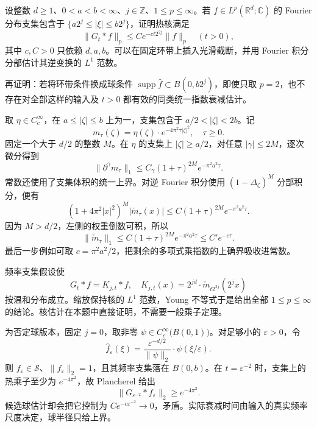 \begin{exercise}\label{b2:ex:19-new-5}
设整数 \(d\geq1\)、\(0<a<b<\infty\)、\(j\in\mathbb Z\)、\(1\leq p\leq\infty\)。若 \(f\in L^p(\mathbb R^d;\mathbb C)\) 的 Fourier 分布支集包含于
\(\{a2^j\leq|\xi|\leq b2^j\}\)，证明热核满足
\[
 \|G_t*f\|_p\leq C e^{-c t2^{2j}}\|f\|_p
 \quad(t>0),
\]
其中 \(c,C>0\) 只依赖 \(d,a,b\)。可以在固定环带上插入光滑截断，并用 Fourier 积分分部估计其逆变换的 \(L^1\) 范数。

\ProseParagraphBreak

再证明：若将环带条件换成球条件 \(\operatorname{supp}\widehat f\subset B(0,b2^j)\)，即使只取 \(p=2\)，也不存在对全部这样的输入及 \(t>0\) 都有效的同类统一指数衰减估计。
\end{exercise}
\begin{solution}
取 \(\eta\in C_c^\infty\)，在 \(a\leq|\zeta|\leq b\) 上为一，支集包含于 \(a/2<|\zeta|<2b\)。记
\[
 m_\tau(\zeta)=\eta(\zeta)\cdot e^{-4\pi^2\tau|\zeta|^2},
 \quad \tau\geq0.
\]
固定一个大于 \(d/2\) 的整数 \(M\)。在 \(\eta\) 的支集上 \(|\zeta|\geq a/2\)，对任意 \(|\gamma|\leq2M\)，逐次微分得到
\[
 \|\partial^\gamma m_\tau\|_1
 \leq C_\gamma(1+\tau)^{2M}e^{-\pi^2a^2\tau}.
\]
常数还使用了支集体积的统一上界。对逆 Fourier 积分使用 \((1-\Delta_\zeta)^M\) 分部积分，便有
\[
 (1+4\pi^2|x|^2)^M|\check m_\tau(x)|
 \leq C(1+\tau)^{2M}e^{-\pi^2a^2\tau}.
\]
因为 \(M>d/2\)，左侧的权重倒数可积，所以
\[
 \|\check m_\tau\|_1
 \leq C(1+\tau)^{2M}e^{-\pi^2a^2\tau}
 \leq C'e^{-c\tau}.
\]
最后一步例如可取 \(c=\pi^2a^2/2\)，把剩余的多项式乘指数的上确界吸收进常数。

频率支集假设使
\[
 G_t*f=K_{j,t}*f,
 \quad K_{j,t}(x)=2^{jd}\cdot\check m_{t2^{2j}}(2^jx)
\]
按温和分布成立。缩放保持核的 \(L^1\) 范数，Young 不等式于是给出全部 \(1\leq p\leq\infty\) 的结论。核估计在本题中直接证明，不需要一般乘子定理。

为否定球版本，固定 \(j=0\)，取非零 \(\psi\in C_c^\infty\bigl(B(0,1)\bigr)\)。对足够小的 \(\varepsilon>0\)，令
\[
 \widehat f_\varepsilon(\xi)
 =\frac{\varepsilon^{-d/2}}{\|\psi\|_2}
                  \cdot\psi(\xi/\varepsilon).
\]
则 \(f_\varepsilon\in\mathcal S\)、\(\|f_\varepsilon\|_2=1\)，且其频率支集落在 \(B(0,b)\)。在 \(t=\varepsilon^{-2}\) 时，支集上的热乘子至少为 \(e^{-4\pi^2}\)，故 Plancherel 给出
\[
 \|G_{\varepsilon^{-2}}*f_\varepsilon\|_2
 \geq e^{-4\pi^2}.
\]
候选球估计却会把它控制为 \(Ce^{-c\varepsilon^{-2}}\to0\)，矛盾。实际衰减时间由输入的真实频率尺度决定，球半径只给上界。
\end{solution}

